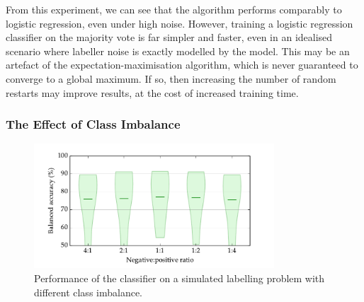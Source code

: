             From this experiment, we can see that the \citeauthor{raykar10}
            algorithm performs comparably to logistic regression, even under
            high noise. However, training a logistic regression classifier on
            the majority vote is far simpler and faster, even in an idealised
            scenario where labeller noise is exactly modelled by the
            \citeauthor{raykar10} model. This may be an artefact of the
            expectation-maximisation algorithm, which is never guaranteed to
            converge to a global maximum. If so, then increasing the number of
            random restarts may improve results, at the cost of increased
            training time.

        \subsubsection{The Effect of Class Imbalance}

            \begin{figure}
                \centering
                \includegraphics[width=0.8\textwidth]
                    {images/experiments/raykar_class_balance_ba}
                \caption{Performance of the \citeauthor{raykar10} classifier on
                    a simulated labelling problem with different class
                    imbalance.}
                \label{fig:raykar-class-balance-ba}
            \end{figure}

